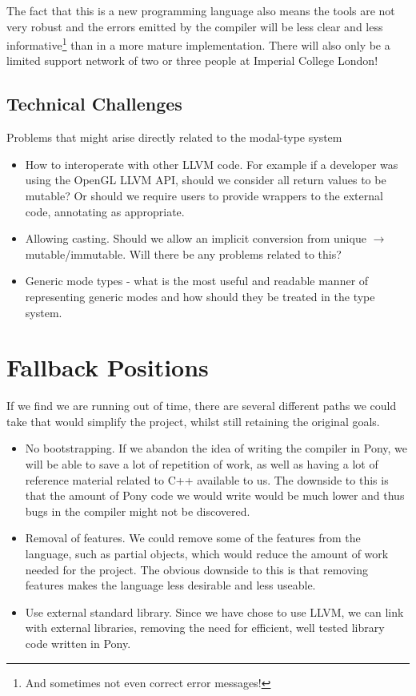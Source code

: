 \documentclass[pdftex,11pt,a4paper]{report}
\begin{document}
The fact that this is a new programming language also means the tools are not very robust and the errors emitted by the compiler will be less clear and less informative\footnote{And sometimes not even correct error messages!} than in a more mature implementation.
There will also only be a limited support network of two or three people at Imperial College London!

\subsection{Technical Challenges}

Problems that might arise directly related to the modal-type system
	\begin{itemize}
		\item How to interoperate with other LLVM code. For example if a developer was using the OpenGL LLVM API, should we consider all return values to be mutable?
			Or should we require users to provide wrappers to the external code, annotating as appropriate.
		\item Allowing casting. Should we allow an implicit conversion from unique $\to$ mutable/immutable.
			Will there be any problems related to this?
		\item Generic mode types - what is the most useful and readable manner of representing generic modes and how should they be treated in the type system.
	\end{itemize}
	
\section{Fallback Positions}
If we find we are running out of time, there are several different paths we could take that would simplify the project, whilst still retaining the original goals.
\begin{itemize}[noitemsep]
\item No bootstrapping.
	If we abandon the idea of writing the compiler in Pony, we will be able to save a lot of repetition of work, as well as having a lot of reference material related to C++ available to us.
	The downside to this is that the amount of Pony code we would write would be much lower and thus bugs in the compiler might not be discovered.
\item Removal of features.
	We could remove some of the features from the language, such as partial objects, which would reduce the amount of work needed for the project.
	The obvious downside to this is that removing features makes the language less desirable and less useable.
\item Use external standard library.
	 Since we have chose to use LLVM, we can link with external libraries, removing the need for efficient, well tested library code written in Pony.
\end{itemize}
\end{document}
